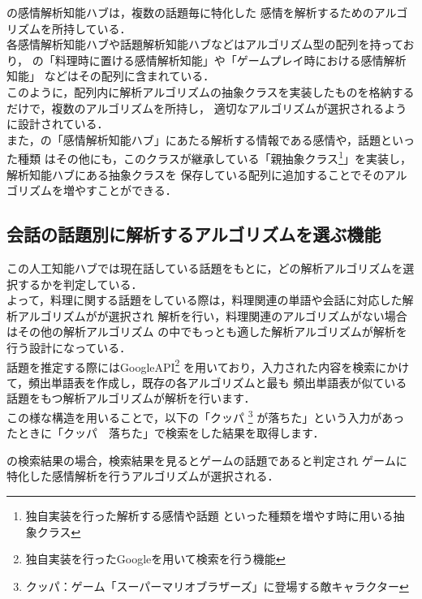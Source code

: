 
の感情解析知能ハブは，複数の話題毎に特化した
感情を解析するためのアルゴリズムを所持している．
\\
各感情解析知能ハブや話題解析知能ハブなどはアルゴリズム型の配列を持っており，
の「料理時に置ける感情解析知能」や「ゲームプレイ時における感情解析知能」
などはその配列に含まれている．\\
このように，配列内に解析アルゴリズムの抽象クラスを実装したものを格納するだけで，複数のアルゴリズムを所持し，
適切なアルゴリズムが選択されるように設計されている．
\\
また，の「感情解析知能ハブ」にあたる解析する情報である感情や，話題といった種類
はその他にも，このクラスが継承している「親抽象クラス\footnote{独自実装を行った解析する感情や話題
といった種類を増やす時に用いる抽象クラス}」を実装し，解析知能ハブにある抽象クラスを
保存している配列に追加することでそのアルゴリズムを増やすことができる．
\\

\subsection{会話の話題別に解析するアルゴリズムを選ぶ機能}
この人工知能ハブでは現在話している話題をもとに，どの解析アルゴリズムを選択するかを判定している．\\
よって，料理に関する話題をしている際は，料理関連の単語や会話に対応した解析アルゴリズムがが選択され
解析を行い，料理関連のアルゴリズムがない場合はその他の解析アルゴリズム
の中でもっとも適した解析アルゴリズムが解析を行う設計になっている．
\\
話題を推定する際にはGoogleAPI\footnote{独自実装を行ったGoogleを用いて検索を行う機能}
を用いており，入力された内容を検索にかけて，頻出単語表を作成し，既存の各アルゴリズムと最も
頻出単語表が似ている話題をもつ解析アルゴリズムが解析を行います．
\\
この様な構造を用いることで，以下の「クッパ
	\footnote{クッパ：ゲーム「スーパーマリオブラザーズ」に登場する敵キャラクター}
が落ちた」という入力があったときに「クッパ　落ちた」で検索をした結果を取得します．


の検索結果の場合，検索結果を見るとゲームの話題であると判定され
ゲームに特化した感情解析を行うアルゴリズムが選択される．\\

